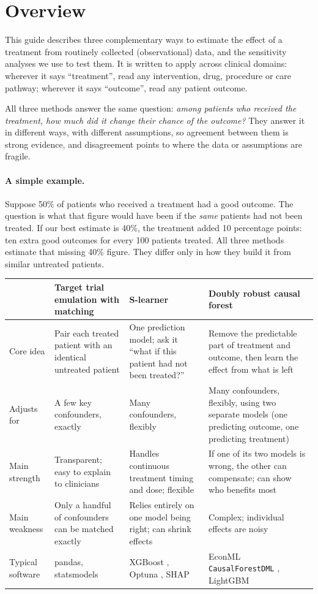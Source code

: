 \section{Overview}

This guide describes three complementary ways to estimate the effect of a treatment from routinely collected (observational) data, and the sensitivity analyses we use to test them. It is written to apply across clinical domains: wherever it says ``treatment'', read any intervention, drug, procedure or care pathway; wherever it says ``outcome'', read any patient outcome.

All three methods answer the same question: \emph{among patients who received the treatment, how much did it change their chance of the outcome?} They answer it in different ways, with different assumptions, so agreement between them is strong evidence, and disagreement points to where the data or assumptions are fragile.

\paragraph{A simple example.} Suppose 50\% of patients who received a treatment had a good outcome. The question is what that figure would have been if the \emph{same} patients had not been treated. If our best estimate is 40\%, the treatment added 10 percentage points: ten extra good outcomes for every 100 patients treated. All three methods estimate that missing 40\% figure. They differ only in how they build it from similar untreated patients.

\begin{xltabular}{\textwidth}{L{2.6cm}YYY}
\toprule
 & \textbf{Target trial emulation with matching} & \textbf{S-learner} & \textbf{Doubly robust causal forest} \\
\midrule
Core idea & Pair each treated patient with an identical untreated patient & One prediction model; ask it ``what if this patient had not been treated?'' & Remove the predictable part of treatment and outcome, then learn the effect from what is left \\
Adjusts for & A few key confounders, exactly & Many confounders, flexibly & Many confounders, flexibly, using two separate models (one predicting outcome, one predicting treatment) \\
Main strength & Transparent; easy to explain to clinicians & Handles continuous treatment timing and dose; flexible & If one of its two models is wrong, the other can compensate; can show who benefits most \\
Main weakness & Only a handful of confounders can be matched exactly & Relies entirely on one model being right; can shrink effects & Complex; individual effects are noisy \\
Typical software & pandas, statsmodels & XGBoost \cite{chen2016xgboost}, Optuna \cite{akiba2019optuna}, SHAP \cite{lundberg2017shap} & EconML \texttt{CausalForestDML} \cite{battocchi2019econml}, LightGBM \cite{ke2017lightgbm} \\
\bottomrule
\end{xltabular}

